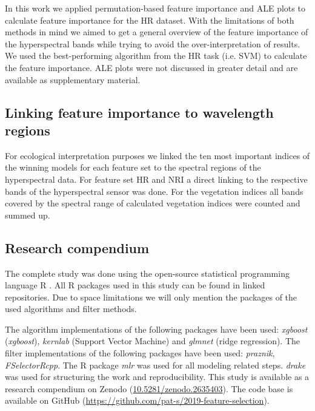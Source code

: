 \documentclass[letterpaper, peerreview]{IEEEtran}
\begin{document}
In this work we applied permutation-based feature importance and \ac{ALE} plots to calculate feature importance for the HR dataset.
With the limitations of both methods in mind we aimed to get a general overview of the feature importance of the hyperspectral bands while trying to avoid the over-interpretation of results.
We used the best-performing algorithm from the HR task (i.e. SVM) to calculate the feature importance.
ALE plots were not discussed in greater detail and are available as supplementary material.

\subsection{Linking feature importance to wavelength regions}

\noindent For ecological interpretation purposes we linked the ten most important indices of the winning models for each feature set to the spectral regions of the hyperspectral data.
For feature set HR and NRI a direct linking to the respective bands of the hyperspectral sensor was done.
For the vegetation indices all bands covered by the spectral range of calculated vegetation indices were counted and summed up.

\subsection{Research compendium}

\noindent The complete study was done using the open-source statistical programming language R \cite{rcoreteam2019}.
All R packages used in this study can be found in linked repositories.
Due to space limitations we will only mention the packages of the used algorithms and filter methods.

The algorithm implementations of the following packages have been used: \textit{xgboost}\cite{chen2016} (\textit{xgboost}), \textit{kernlab}\cite{kernlab} (Support Vector Machine) and \textit{glmnet}\cite{glmnet} (ridge regression).
The filter implementations of the following packages have been used: \textit{praznik\cite{praznik}}, \textit{FSelectorRcpp}\cite{fselectorrcpp}.
The R package \textit{mlr} \cite{mlr} was used for all modeling related steps.
\textit{drake} \cite{drake} was used for structuring the work and reproducibility.
This study is available as a research compendium on Zenodo (\url{10.5281/zenodo.2635403}).
The code base is available on GitHub (\url{https://github.com/pat-s/2019-feature-selection}).
\end{document}
